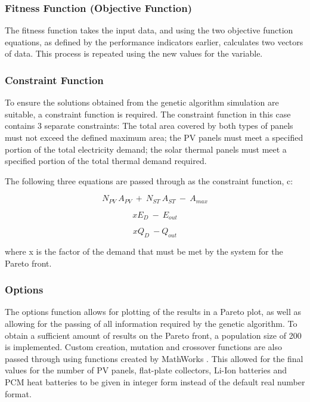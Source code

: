 \subsubsection{Fitness Function (Objective Function)} 
The fitness function takes the input data, and using the two objective function equations, as defined by the performance indicators earlier, calculates two vectors of data. This process is repeated using the new values for the variable.

\subsubsection{Constraint Function}
To ensure the solutions obtained from the genetic algorithm simulation are suitable, a constraint function is required. The constraint function in this case contains 3 separate constraints: The total area covered by both types of panels must not exceed the defined maximum area; the PV panels must meet a specified portion of the total electricity demand; the solar thermal panels must meet a specified portion of the total thermal demand required.

The following three equations are passed through as the constraint function, c:
 
\begin{equation}
N_{PV} \ A_{PV} \ + \ N_{ST} \ A_{ST} \ - \ A_{max}
\end{equation}

\begin{equation}
x E_D \ - \ E_{out}
\end{equation}

\begin{equation}
x Q_D \ - Q_{out}
\end{equation}

where x is the factor of the demand that must be met by the system for the Pareto front.

\subsubsection{Options}

The options function allows for plotting of the results in a Pareto plot, as well as allowing for the passing of all information required by the genetic algorithm. To obtain a sufficient amount of results on the Pareto front, a population size of 200 is implemented. Custom creation, mutation and crossover functions are also passed through using functions created by MathWorks \cite{matlabb}. This allowed for the final values for the number of PV panels, flat-plate collectors, Li-Ion batteries and PCM heat batteries to be given in integer form instead of the default real number format.

